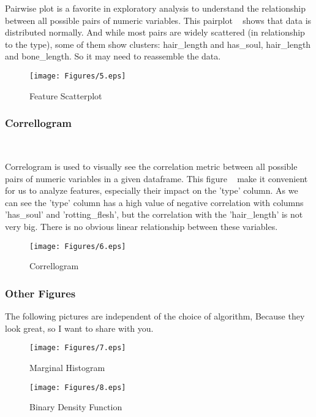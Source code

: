 Pairwise plot is 
a favorite in exploratory analysis 
to understand the relationship 
between all possible pairs 
of numeric variables. 
This pairplot ~ 
shows that data is distributed normally. 
And while most pairs are widely scattered 
(in relationship to the type), 
some of them show clusters: 
hair\_length and has\_soul, 
hair\_length and bone\_length. 
So it may need to reassemble the data.

\begin{figure}[htbp]
	\centering
	\texttt{[image: Figures/5.eps]}
	\caption{Feature Scatterplot}\label{fig:feature_scatterplot}
\end{figure}

\subsubsection{Correllogram}
\

Correlogram is used to 
visually see the correlation metric 
between all possible pairs of numeric variables 
in a given dataframe. 
This figure ~ 
make it convenient for us to analyze features,
especially their impact on the 'type' column. 
As we can see the 'type' column 
has a high value of negative correlation 
with columns 'has\_soul' and 'rotting\_flesh',
but the correlation 
with the 'hair\_length' is not very big.
There is no obvious linear relationship 
between these variables.

\begin{figure}[htbp]
	\centering
	\texttt{[image: Figures/6.eps]}
	\caption{Correllogram}\label{fig:corr}
\end{figure}


\subsubsection{Other Figures}


The following pictures 
are independent of 
the choice of algorithm,
Because they look great, 
so I want to share with you.

\begin{figure}[h]\centering
	\texttt{[image: Figures/7.eps]}
	\caption{Marginal Histogram}
\end{figure}

\begin{figure}[h]\centering
	\texttt{[image: Figures/8.eps]}
	\caption{Binary Density Function}
\end{figure}

